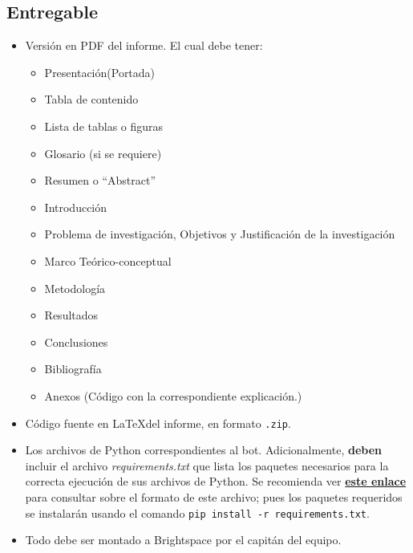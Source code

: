 \subsection*{Entregable}
\begin{itemize}
    \item Versión en PDF del informe. El cual debe tener:
    \begin{itemize}
        \item Presentación(Portada)
        \item Tabla de contenido
        \item Lista de tablas o figuras
        \item Glosario (si se requiere)
        \item Resumen o “Abstract”
        \item Introducción
        \item Problema de investigación, Objetivos y  Justificación de la investigación
        \item Marco Teórico-conceptual
        \item Metodología
        \item Resultados
        \item Conclusiones
        \item Bibliografía
        \item Anexos (Código con la correspondiente explicación.)
    \end{itemize}
    \item Código fuente en \LaTeX del informe, en formato \verb!.zip!.
    \item Los archivos de Python correspondientes al bot. Adicionalmente, \textbf{deben} incluir el archivo \textit{requirements.txt} que lista los paquetes necesarios para la correcta ejecución de sus archivos de Python. Se recomienda ver \href{https://pip.pypa.io/en/stable/user\_guide/#requirements-files}{\textbf{este enlace}} para consultar sobre el formato de este archivo; pues los paquetes requeridos se instalarán usando el comando \verb!pip install -r requirements.txt!.
    \item Todo debe ser montado a Brightspace por el capitán del equipo.
\end{itemize}



